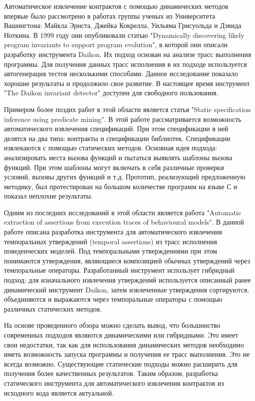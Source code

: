 Автоматическое извлечение контрактов с помощью динамических методов впервые было рассмотрено в работах группы ученых из Университета Вашингтона: Майкла Эрнста, Джейка Кокрелла, Уильяма Грисуольда и Дэвида Ноткина. В 1999 году они опубликовали статью "Dynamically discovering likely program invariants to support program evolution", в которой они описали разработку инструмента Daikon\cite{discoveringInvariants}. Их подход основан на анализе трасс выполнения программы. Для получения данных трасс исполнения в их подходе используется автогенерация тестов несколькими способами. Данное исследование показало хорошие результаты и продолжило свое развитие. В настоящее время инструмент "The Daikon invariant detector" доступен для свободного пользования\cite{daikon}.

Примером более поздих работ в этой области является статья "Static specification inference using predicate mining"\cite{staticPredicateMining}. В этой работе рассматривается возможность автоматического извлечения спецификаций. При этом спецификации в ней делятся на два типа: контракты и спецификации библиотек. Спецификации извлекаются с помощью статических методов. Основная идея подхода: анализировать места вызова функций и пытаться выявлять шаблоны вызова функций. При этом шаблоны могут включать в себя различные проверки условий, вызовы других функций и т.д. Прототип, реализующий предложенную методику, был протестирован на большом количестве программ на языке С и показал неплохие результаты.

Одним из последних исследований в этой области является работа "Automatic extraction of assertions from execution traces of behavioural models"\cite{automiticAssertionsExtraction}. В данной работе описана разработка инструмента для автоматического извлечения темпоральных утверждений (temporal assertions) из трасс исполнения поведенческих моделей. Под темпоральными утверждениями при этом понимаются утверждения, являющиеся композицией обычных утверждений через темпоральные операторы. Разработанный инструмент использует гибридный подход: для изначального извлечения утверждений используется описанный ранее динамический инструмент Daikon, затем извлеченные утверждения сортируются, объединяются и выражаются через темпоральные операторы с помощью различных статических методов.

На основе проведенного обзора можно сделать вывод, что большинство современных подходов являются динамическими или гибридными. Это имеет свои недостатки, так как для использования динамических методов необходимо иметь возможность запуска программы и получения ее трасс выполнения. Это не всегда возможно. Существующие статические подходы можно расширить для получения более качественных результатов. Таким образом, разработка статического инструмента для автоматического извлечения контрактов из исходного кода является актуальной.

